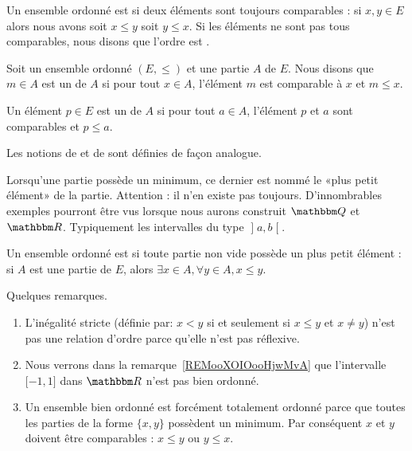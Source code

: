 \begin{definition}      \label{DEFooVGYQooUhUZGr}
    Un ensemble ordonné est  si deux éléments sont toujours comparables : si \( x,y\in E\) alors nous avons soit \( x\leq y\) soit \( y\leq x\). Si les éléments ne sont pas tous comparables, nous disons que l'ordre est .
\end{definition}

\begin{definition}\label{MinMaxMaj_ensembleOrdonnes}
    Soit un ensemble ordonné \( (E,\leq)\) et une partie \( A\) de \( E\). Nous disons que \( m\in A\) est un  de \( A\) si pour tout \( x\in A\), l'élément \( m\) est comparable à \( x\) et \( m\leq x\).

    Un élément \( p\in E\) est un  de \( A\) si pour tout \( a\in A\), l'élément \( p\) et \( a\) sont comparables et \( p\leq a\).

    Les notions de  et de  sont définies de façon analogue.
\end{definition}

Lorsqu'une partie possède un minimum, ce dernier est nommé le «plus petit élément» de la partie. Attention : il n'en existe pas toujours. D'innombrables exemples pourront être vus lorsque nous aurons construit \( \eQ\) et \( \eR\). Typiquement les intervalles du type \( \mathopen] a , b \mathclose[\).

\begin{definition}   \label{DEFooLJEAooBLGsiS}
    Un ensemble ordonné est  si toute partie non vide possède un plus petit élément : si \( A\) est une partie de \( E\), alors \( \exists x\in A,\forall y\in A, x\leq y\).
\end{definition}

\begin{normaltext}
    Quelques remarques.
    \begin{enumerate}
        \item
            L'inégalité stricte (définie par: \( x<y\) si et seulement si \( x\leq y\) et \( x\neq y\)) n'est pas une relation d'ordre parce qu'elle n'est pas réflexive.
        \item
            Nous verrons dans la remarque~\ref{REMooXOIOooHjwMvA} que l'intervalle \( \mathopen[ -1 , 1 \mathclose]\) dans \( \eR\) n'est pas bien ordonné.
        \item
            Un ensemble bien ordonné est forcément totalement ordonné parce que toutes les parties de la forme \( \{ x,y \}\) possèdent un minimum. Par conséquent \( x\) et \( y\) doivent être comparables : \( x\leq y\) ou \( y\leq x\).
    \end{enumerate}
\end{normaltext}

